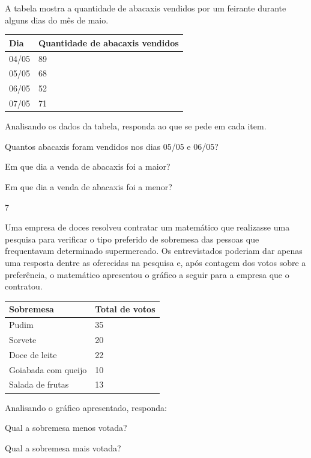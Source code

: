 \begin{multicols}{2}
\begin{enumerate}
{A tabela mostra a quantidade de abacaxis vendidos por um feirante
durante alguns dias do mês de maio.

\begin{longtable}[]{@{}ll@{}}
\toprule
Dia & Quantidade de abacaxis vendidos\tabularnewline
\midrule
\endhead
04/05 & 89\tabularnewline
05/05 & 68\tabularnewline
06/05 & 52\tabularnewline
07/05 & 71\tabularnewline
\bottomrule
\end{longtable}

Analisando os dados da tabela, responda ao que se pede em cada item.

\begin{escolha}
  \item
  Quantos abacaxis foram vendidos nos dias 05/05 e 06/05?

\item
  Em que dia a venda de abacaxis foi a maior?

\item
  Em que dia a venda de abacaxis foi a menor?
\end{escolha}

\num{7}

Uma empresa de doces resolveu contratar um matemático que realizasse uma
pesquisa para verificar o tipo preferido de sobremesa das pessoas que
frequentavam determinado supermercado. Os entrevistados poderiam dar
apenas uma resposta dentre as oferecidas na pesquisa e, após contagem dos
votos sobre a preferência, o matemático apresentou o gráfico a seguir
para a empresa que o contratou.

\begin{longtable}[]{@{}ll@{}}
\toprule
Sobremesa & Total de votos\tabularnewline
\midrule
\endhead
Pudim & 35\tabularnewline
Sorvete & 20\tabularnewline
Doce de leite & 22\tabularnewline
Goiabada com queijo & 10\tabularnewline
Salada de frutas & 13\tabularnewline
\bottomrule
\end{longtable}

Analisando o gráfico apresentado, responda:

\begin{escolha}

\item
  Qual a sobremesa menos votada?

\item
  Qual a sobremesa mais votada?


\end{escolha}}
\end{enumerate}
\end{multicols}
